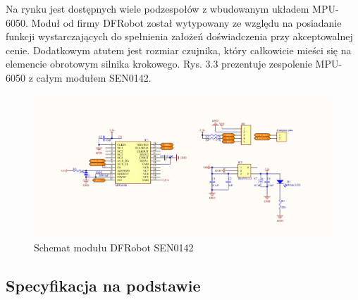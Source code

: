 Na rynku jest dostępnych wiele podzespołów z wbudowanym układem MPU-6050. Moduł od firmy DFRobot został wytypowany ze względu na posiadanie funkcji wystarczających do spełnienia założeń doświadczenia przy akceptowalnej cenie. Dodatkowym atutem jest rozmiar czujnika, który całkowicie mieści się na elemencie obrotowym silnika krokowego. Rys. 3.3 prezentuje zespolenie MPU-6050 z całym modułem SEN0142.

\begin{figure}[H]
    \centering
    \includegraphics[width=\textwidth]{pictures/short_schema.png}    
    \caption{Schemat modułu DFRobot SEN0142 \cite{shop}}
    \label{fig:DFRobot_scheme}
\end{figure}

\newpage

\subsection*{Specyfikacja na podstawie \cite{dfr}}


